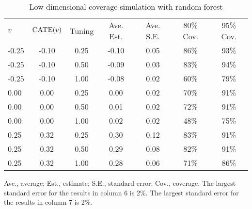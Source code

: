 \begin{table}[H]
\centering
  \begin{threeparttable}
    \caption{Low dimensional coverage simulation with random forest}
     \begin{tabular}{lcccccc}
       $v$& $\textsc{CATE}(v)$ & Tuning &  Ave. Est. & Ave. S.E. &  80\% Cov. & 95\% Cov. \\[5pt]
-0.25 & -0.10 & 0.25 & -0.10 & 0.05 &  86\% & 93\% \\
-0.25 & -0.10 & 0.50 & -0.09 & 0.03  & 83\% & 94\% \\
-0.25 & -0.10 & 1.00 & -0.08 & 0.02  & 60\% & 79\% \\
0.00 & 0.00 & 0.25 & 0.00 & 0.02 &  70\% & 91\% \\
0.00 & 0.00 & 0.50 & 0.01 & 0.02  & 72\% & 91\% \\
0.00 & 0.00 & 1.00 & 0.02 & 0.02  & 48\% & 75\% \\
0.25 & 0.32 & 0.25 & 0.30 & 0.12 &  83\% & 91\% \\
0.25 & 0.32 & 0.50 & 0.29 & 0.08  & 82\% & 91\% \\
0.25 & 0.32 & 1.00 & 0.28 & 0.06  & 71\% & 86\% 
     \end{tabular}
     \label{tab:rf_low}
    \begin{tablenotes}
      \small
      \item Ave., average; Est., estimate; S.E., standard error; Cov., coverage. The largest standard error for the results in column 6 is 2\%. The largest standard error for the results in column 7 is 2\%.
    \end{tablenotes}
  \end{threeparttable}
\end{table}

